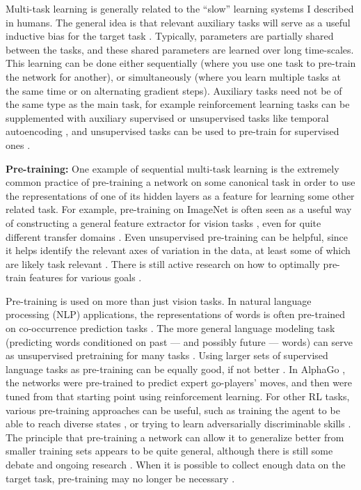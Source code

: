 Multi-task learning is generally related to the ``slow'' learning systems I described in humans. The general idea is that relevant auxiliary tasks will serve as a useful inductive bias for the target task \citep{Caruana1997}. Typically, parameters are partially shared between the tasks, and these shared parameters are learned over long time-scales. This learning can be done either sequentially (where you use one task to pre-train the network for another), or simultaneously (where you learn multiple tasks at the same time or on alternating gradient steps). Auxiliary tasks need not be of the same type as the main task, for example reinforcement learning tasks can be supplemented with auxiliary supervised or unsupervised tasks like temporal autoencoding \citep[e.g.][]{Hermann2017}, and unsupervised tasks can be used to pre-train for supervised ones \citep[e.g.][]{Wu2018}. \par
\textbf{Pre-training:} One example of sequential multi-task learning is the extremely common practice of pre-training a network on some canonical task in order to use the representations of one of its hidden layers as a feature for learning some other related task. For example, pre-training on ImageNet \citep{Deng2009} is often seen as a useful way of constructing a general feature extractor for vision tasks \citep{Huh2016}, even for quite different transfer domains \citep[e.g.][]{Marmanis2016}. Even unsupervised pre-training can be helpful, since it helps identify the relevant axes of variation in the data, at least some of which are likely task relevant \citep{Erhan2010}. There is still active research on how to optimally pre-train features for various goals \citep[e.g.][]{Wu2018}. \par    
Pre-training is used on more than just vision tasks. In natural language processing (NLP) applications, the representations of words is often pre-trained on co-occurrence prediction tasks \citep[e.g.][]{Pennington2014}. The more general language modeling task (predicting words conditioned on past --- and possibly future --- words) can serve as unsupervised pretraining for many tasks \citep[e.g.][]{Radford2019}. Using larger sets of supervised language tasks as pre-training can be equally good, if not better \citep{Raffel2019}. In AlphaGo \citep{Silver2016}, the networks were pre-trained to predict expert go-players' moves, and then were tuned from that starting point using reinforcement learning. For other RL tasks, various pre-training approaches can be useful, such as training the agent to be able to reach diverse states \citep{Gregor2016}, or trying to learn adversarially discriminable skills \citep{Eysenbach2019}. The principle that pre-training a network can allow it to generalize better from smaller training sets appears to be quite general, although there is still some debate and ongoing research \citep[e.g]{He2018}. When it is possible to collect enough data on the target task, pre-training may no longer be necessary \citep[e.g.][]{Silver2017}. \par
